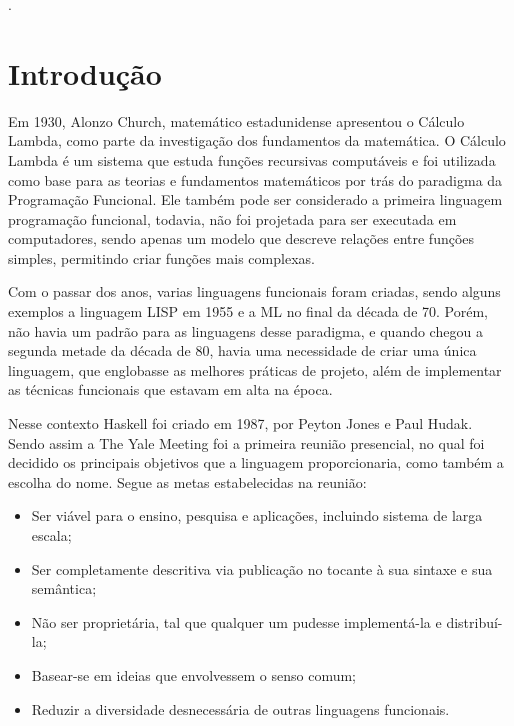 \documentclass[
  12pt,				         %
  oneside,			       %
  a4paper,			       %
  english,		       	 %
  brazil,			      	 %
]{abntex2}
\begin{document}
 

    \renewcommand{\thesection}{\noindent\arabic{chapter}.\arabic{section}}. 
    \frenchspacing
    \imprimircapa
    \tableofcontents*
    \cleardoublepage
    \textual
    \newpage
    \chapter*[Introdução]{Introdução}

    Em 1930, Alonzo Church, matemático estadunidense apresentou o Cálculo Lambda, como parte da investigação dos fundamentos da matemática. O Cálculo Lambda é um sistema que
    estuda funções recursivas computáveis e foi utilizada como base para as teorias e fundamentos matemáticos por trás do paradigma da Programação Funcional. Ele também
    pode ser considerado a primeira linguagem programação funcional, todavia, não foi projetada para ser executada em computadores, sendo apenas um modelo que descreve relações entre funções
    simples, permitindo criar funções mais complexas.

    Com o passar dos anos, varias linguagens funcionais foram criadas, sendo alguns exemplos a linguagem LISP em 1955 e a ML no final da década de 70. Porém, não
    havia um padrão para as linguagens desse paradigma, e quando chegou a segunda metade da década de 80, havia uma necessidade de criar uma única linguagem, que englobasse
    as melhores práticas de projeto, além de implementar as técnicas funcionais que estavam em alta na época.

    Nesse contexto Haskell foi criado em 1987, por Peyton Jones e Paul Hudak. Sendo assim a The Yale Meeting foi a primeira reunião presencial, no qual foi decidido
    os principais objetivos que a linguagem proporcionaria, como também a escolha do nome. 
    Segue as metas estabelecidas na reunião:

    \begin{itemize}
      \item Ser viável para o ensino, pesquisa e aplicações, incluindo sistema de larga escala;
      \item Ser completamente descritiva via publicação no tocante à sua sintaxe e sua semântica;
      \item Não ser proprietária, tal que qualquer um pudesse implementá-la e distribuí-la;
      \item Basear-se em ideias que envolvessem o senso comum;
      \item Reduzir a diversidade desnecessária de outras linguagens funcionais.
    \end{itemize} 
\end{document}
